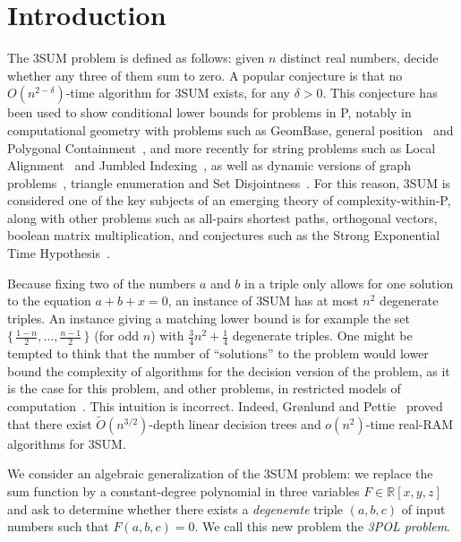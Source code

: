 \section{Introduction}

The 3SUM problem is defined as follows: given $n$ distinct real numbers, decide
whether any three of them sum to zero.
%
A popular conjecture is that no $O(n^{2-\delta})$-time algorithm for 3SUM
exists, for any $\delta > 0$. This conjecture has been used to show conditional
lower bounds for problems in P, notably in computational geometry with problems
such as
GeomBase, general position~\cite{GO95}
and
Polygonal Containment~\cite{BH01},
and more recently for string problems such as
Local Alignment~\cite{AVW14}
and
Jumbled Indexing~\cite{ACLL14},
as well as
dynamic versions of graph problems~\cite{P10,AV14},
triangle enumeration and Set Disjointness~\cite{KPP16}.
%
For this reason, 3SUM is considered one of the key subjects of an
emerging theory of complexity-within-P, along with other problems such as
all-pairs shortest paths,
orthogonal vectors,
boolean matrix multiplication,
and conjectures such as
the Strong Exponential Time Hypothesis~\cite{AVY15,HKNS15,CGIMPS16}.

Because fixing two of the numbers $a$ and $b$ in a triple only allows for one
solution to the equation $a + b + x = 0$, an instance of 3SUM has at most
$n^2$ degenerate triples. An instance giving a matching lower bound is for
example the set $\{\,\frac{1-n}{2},\ldots,\frac{n-1}{2}\,\}$ (for odd $n$)
with $\frac{3}{4} n^2 + \frac 14$ degenerate triples.
%
One might be tempted to think that the number of ``solutions'' to the problem
would lower bound the complexity of algorithms for the decision version of the
problem, as it is the case for this problem, and other problems, in restricted
models of computation~\cite{E96,E99}.
%
This intuition is incorrect.
%
Indeed, Gr\o nlund and Pettie~\cite{GP14} proved that there exist
$\tilde{O}(n^{3/2})$-depth linear decision trees and $o(n^2)$-time real-RAM
algorithms for 3SUM\@.

We consider an algebraic generalization of the 3SUM problem: we replace the sum
function by a constant-degree polynomial in three variables $F \in
\mathbb{R}[x,y,z]$ and ask to determine whether there exists a
\emph{degenerate} triple $(a,b,c)$ of input numbers such that $F(a,b,c)=0$. We
call this new problem the \emph{3POL problem}.

